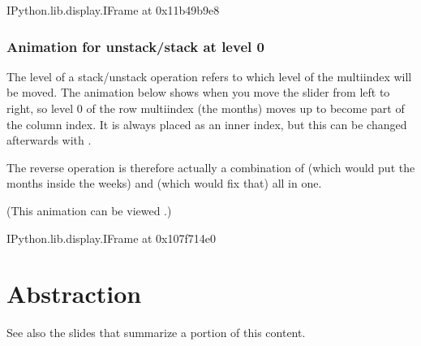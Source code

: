 \documentclass[letterpaper,10pt,english]{sphinxmanual}
\begin{document}
\begin{sphinxVerbatim}[commandchars=\\\{\}]
\PYGZlt{}IPython.lib.display.IFrame at 0x11b49b9e8\PYGZgt{}
\end{sphinxVerbatim}


\subsection{Animation for unstack/stack at level 0}
\label{\detokenize{chapter-6-single-table-verbs:animation-for-unstack-stack-at-level-0}}
The level of a stack/unstack operation refers to which level of the multi\sphinxhyphen{}index will be moved.  The animation below shows  when you move the slider from left to right, so level 0 of the row multi\sphinxhyphen{}index (the months) moves up to become part of the column index.  It is always placed as an inner index, but this can be changed afterwards with .

The reverse operation is therefore actually a combination of  (which would put the months inside the weeks) and  (which would fix that) all in one.

(This animation can be viewed .)

\begin{sphinxVerbatim}[commandchars=\\\{\}]
   
 
          
\end{sphinxVerbatim}

\begin{sphinxVerbatim}[commandchars=\\\{\}]
\PYGZlt{}IPython.lib.display.IFrame at 0x107f714e0\PYGZgt{}
\end{sphinxVerbatim}


\chapter{Abstraction}
\label{\detokenize{chapter-7-abstraction:abstraction}}\label{\detokenize{chapter-7-abstraction::doc}}
See also the slides that summarize a portion of this content.
\end{document}
